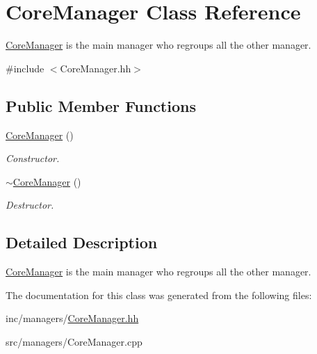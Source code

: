\hypertarget{classCoreManager}{}\section{Core\+Manager Class Reference}
\label{classCoreManager}


\hyperlink{classCoreManager}{Core\+Manager} is the main manager who regroups all the other manager.  




{\ttfamily \#include $<$Core\+Manager.\+hh$>$}

\subsection*{Public Member Functions}
\begin{DoxyCompactItemize}
\item 
\mbox{\label{classCoreManager_a0147fc3a8a8fca6b1f464d8b1257a304}} 
\hyperlink{classCoreManager_a0147fc3a8a8fca6b1f464d8b1257a304}{Core\+Manager} ()
\begin{DoxyCompactList}\small\item\em Constructor. \end{DoxyCompactList}\item 
\mbox{\label{classCoreManager_ac3489a741174a8d5e09effe11df18100}} 
\hyperlink{classCoreManager_ac3489a741174a8d5e09effe11df18100}{$\sim$\+Core\+Manager} ()
\begin{DoxyCompactList}\small\item\em Destructor. \end{DoxyCompactList}\end{DoxyCompactItemize}


\subsection{Detailed Description}
\hyperlink{classCoreManager}{Core\+Manager} is the main manager who regroups all the other manager. 

The documentation for this class was generated from the following files\+:\begin{DoxyCompactItemize}
\item 
inc/managers/\hyperlink{CoreManager_8hh}{Core\+Manager.\+hh}\item 
src/managers/Core\+Manager.\+cpp\end{DoxyCompactItemize}
